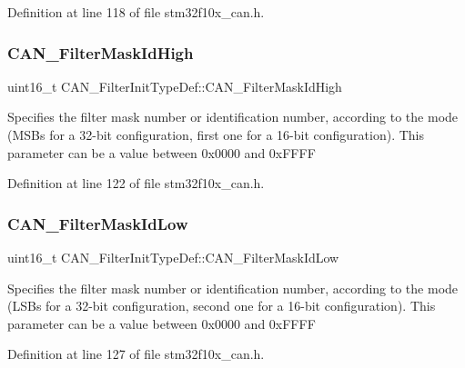 Definition at line 118 of file stm32f10x\+\_\+can.\+h.

\mbox{\label{struct_c_a_n___filter_init_type_def_a6f34539615e6484f266b46aa8f362a91}} 
\subsubsection{\texorpdfstring{C\+A\+N\+\_\+\+Filter\+Mask\+Id\+High}{CAN\_FilterMaskIdHigh}}
{\footnotesize\ttfamily uint16\+\_\+t C\+A\+N\+\_\+\+Filter\+Init\+Type\+Def\+::\+C\+A\+N\+\_\+\+Filter\+Mask\+Id\+High}

Specifies the filter mask number or identification number, according to the mode (M\+S\+Bs for a 32-\/bit configuration, first one for a 16-\/bit configuration). This parameter can be a value between 0x0000 and 0x\+F\+F\+FF 

Definition at line 122 of file stm32f10x\+\_\+can.\+h.

\mbox{\label{struct_c_a_n___filter_init_type_def_a0f052daf04b0a481ecfa5c2cc8058089}} 
\subsubsection{\texorpdfstring{C\+A\+N\+\_\+\+Filter\+Mask\+Id\+Low}{CAN\_FilterMaskIdLow}}
{\footnotesize\ttfamily uint16\+\_\+t C\+A\+N\+\_\+\+Filter\+Init\+Type\+Def\+::\+C\+A\+N\+\_\+\+Filter\+Mask\+Id\+Low}

Specifies the filter mask number or identification number, according to the mode (L\+S\+Bs for a 32-\/bit configuration, second one for a 16-\/bit configuration). This parameter can be a value between 0x0000 and 0x\+F\+F\+FF 

Definition at line 127 of file stm32f10x\+\_\+can.\+h.

